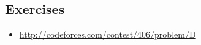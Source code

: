  
\subsection{Exercises}
\begin{itemize}
 \item \url{http://codeforces.com/contest/406/problem/D}
\end{itemize}
